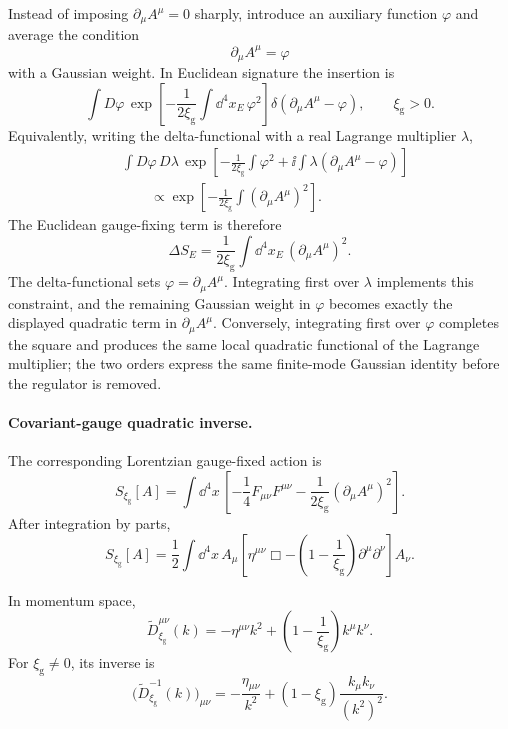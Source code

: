 \begin{remark}
\label{prop:lorenz-gauge-gaussian-averaging}
Instead of imposing \(\partial_\mu A^\mu=0\) sharply, introduce an auxiliary
function \(\varphi\) and average the condition
\[
  \partial_\mu A^\mu=\varphi
\]
with a Gaussian weight. In Euclidean signature the insertion is
\[
  \int D\varphi\,
  \exp\left[
    -\frac{1}{2\xi_{\mathrm g}}
    \int\dd^4x_E\,\varphi^2
  \right]
  \delta(\partial_\mu A^\mu-\varphi),
  \qquad
  \xi_{\mathrm g}>0.
\]
Equivalently, writing the delta-functional with a real Lagrange multiplier
\(\lambda\),
\[
\begin{aligned}
  &\int D\varphi\,D\lambda\,
  \exp\left[
    -\frac{1}{2\xi_{\mathrm g}}\int\varphi^2
    +
    \ii\int\lambda(\partial_\mu A^\mu-\varphi)
  \right]  \\
  &\qquad
  \propto
  \exp\left[
    -\frac{1}{2\xi_{\mathrm g}}
    \int(\partial_\mu A^\mu)^2
  \right].
\end{aligned}
\]
The Euclidean gauge-fixing term is therefore
\[
  \Delta S_E
  =
  \frac{1}{2\xi_{\mathrm g}}
  \int\dd^4x_E\,(\partial_\mu A^\mu)^2 .
\]
The delta-functional sets \(\varphi=\partial_\mu A^\mu\).  Integrating first
over \(\lambda\) implements this constraint, and the remaining Gaussian
weight in \(\varphi\) becomes exactly the displayed quadratic term in
\(\partial_\mu A^\mu\).  Conversely, integrating first over \(\varphi\)
completes the square and produces the same local quadratic functional of the
Lagrange multiplier; the two orders express the same finite-mode Gaussian
identity before the regulator is removed.
\end{remark}

\paragraph{Covariant-gauge quadratic inverse.}
The corresponding Lorentzian gauge-fixed action is
\[
  S_{\xi_{\mathrm g}}[A]
  =
  \int\dd^4x\,
  \left[
    -\frac14F_{\mu\nu}F^{\mu\nu}
    -
    \frac{1}{2\xi_{\mathrm g}}(\partial_\mu A^\mu)^2
  \right].
\]
After integration by parts,
\[
  S_{\xi_{\mathrm g}}[A]
  =
  \frac12\int\dd^4x\,
  A_\mu
  \left[
    \eta^{\mu\nu}\Box
    -
    \left(1-\frac1{\xi_{\mathrm g}}\right)
    \partial^\mu\partial^\nu
  \right]
  A_\nu .
\]

In momentum space,
\[
  \widetilde D_{\xi_{\mathrm g}}^{\mu\nu}(k)
  =
  -\eta^{\mu\nu}k^2
  +
  \left(1-\frac1{\xi_{\mathrm g}}\right)k^\mu k^\nu .
\]
For \(\xi_{\mathrm g}\ne0\), its inverse is
\[
  \bigl(\widetilde D_{\xi_{\mathrm g}}^{-1}(k)\bigr)_{\mu\nu}
  =
  -\frac{\eta_{\mu\nu}}{k^2}
  +
  (1-\xi_{\mathrm g})\frac{k_\mu k_\nu}{(k^2)^2}.
\]

